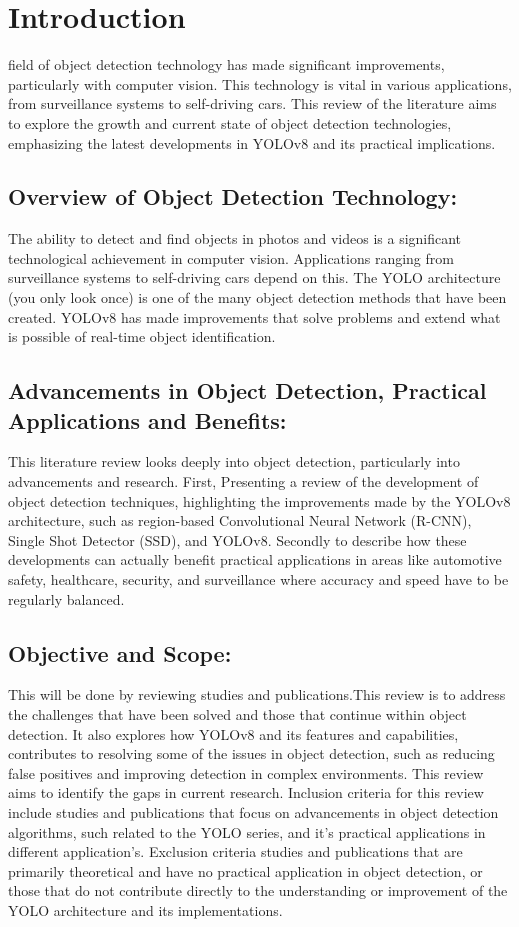 \documentclass[11pt,journal,compsoc]{IEEEtran}
\begin{document}
\section{Introduction}
\label{sec:introduction}
 field of object detection technology has made significant improvements, particularly with computer vision. This technology is vital in various applications, from surveillance systems to self-driving cars. This review of the literature aims to explore the growth and current state of object detection technologies, emphasizing the latest developments in YOLOv8 and its practical implications.


\subsection{Overview of Object Detection Technology:}
The ability to detect and find objects in photos and videos is a significant technological achievement in computer vision. Applications ranging from surveillance systems to self-driving cars depend on this. The YOLO architecture (you only look once) is one of the many object detection methods that have been created. YOLOv8 has made improvements that solve problems and extend what is possible of real-time object identification.
\subsection{Advancements in Object Detection, Practical Applications and Benefits:}
This literature review looks deeply into object detection, particularly into advancements and research. First, Presenting a review of the development of object detection techniques, highlighting the improvements made by the YOLOv8 architecture, such as region-based Convolutional Neural Network (R-CNN), Single Shot Detector (SSD), and YOLOv8. Secondly to describe how these developments can actually benefit practical applications in areas like automotive safety, healthcare, security, and surveillance where accuracy and speed have to be regularly balanced.

\subsection{Objective and Scope:}
This will be done by reviewing studies and publications.This review is to address the challenges that have been solved and those that continue within object detection. It also explores how YOLOv8 and its features and capabilities, contributes to resolving some of the issues in object detection, such as reducing false positives and improving detection in complex environments. This review aims to identify the gaps in current research. Inclusion criteria for this review include studies and publications that focus on advancements in object detection algorithms, such related to the YOLO series, and it's practical applications in different application's. Exclusion criteria studies and publications that are primarily theoretical and have no practical application in object detection, or those that do not contribute directly to the understanding or improvement of the YOLO architecture and its implementations.
\end{document}
